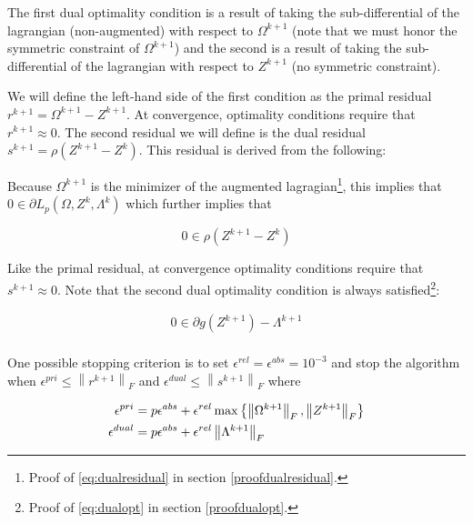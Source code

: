 \documentclass[11pt,]{report}
\begin{document}
The first dual optimality condition is a result of taking the sub-differential of the lagrangian (non-augmented) with respect to \(\Omega^{k + 1}\) (note that we must honor the symmetric constraint of \(\Omega^{k + 1}\)) and the second is a result of taking the sub-differential of the lagrangian with respect to \(Z^{k + 1}\) (no symmetric constraint).

We will define the left-hand side of the first condition as the primal residual \(r^{k + 1} = \Omega^{k + 1} - Z^{k + 1}\). At convergence, optimality conditions require that \(r^{k + 1} \approx 0\). The second residual we will define is the dual residual \(s^{k + 1} = \rho\left( Z^{k + 1} - Z^{k} \right)\). This residual is derived from the following:

Because \(\Omega^{k + 1}\) is the minimizer of the augmented lagragian\footnote{Proof of \eqref{eq:dualresidual} in section \ref{proofdualresidual}.}, this implies that \(0 \in \partial L_{p}\left( \Omega, Z^{k}, \Lambda^{k} \right)\) which further implies that

\begin{equation}
0 \in \rho\left( Z^{k + 1} - Z^{k} \right)
\label{eq:dualresidual}
\end{equation}

Like the primal residual, at convergence optimality conditions require that \(s^{k + 1} \approx 0\). Note that the second dual optimality condition is always satisfied\footnote{Proof of \eqref{eq:dualopt} in section \ref{proofdualopt}.}:

\begin{equation}
\begin{split}
  0 \in \partial g\left(Z^{k + 1}\right) - \Lambda^{k + 1} \\
\label{eq:dualopt}
\end{split}
\end{equation}

One possible stopping criterion is to set \(\epsilon^{rel} = \epsilon^{abs} = 10^{-3}\) and stop the algorithm when \(\epsilon^{pri} \leq \left\| r^{k + 1} \right\|_{F}\) and \(\epsilon^{dual} \leq \left\| s^{k + 1} \right\|_{F}\) where

\begin{equation}
\begin{split}
  \epsilon^{pri} &= p\epsilon^{abs} + \epsilon^{rel}\max\left\{ \left\| \Omega^{k + 1} \right\|_{F}, \left\| Z^{k + 1} \right\|_{F} \right\} \\
  \epsilon^{dual} &= p\epsilon^{abs} + \epsilon^{rel}\left\| \Lambda^{k + 1} \right\|_{F}
\label{eq:admmstopping}\notag
\end{split}
\end{equation}
\end{document}
